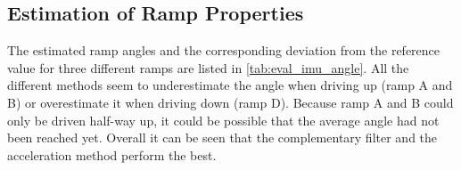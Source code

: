 \subsection{Estimation of Ramp Properties}
The estimated ramp angles and the corresponding deviation from the reference value for three different ramps are listed in \cref{tab:eval_imu_angle}.
All the different methods seem to underestimate the angle when driving up (ramp A and B) or overestimate it when driving down (ramp D).
Because ramp A and B could only be driven half-way up, it could be possible that the average angle had not been reached yet.
Overall it can be seen that the complementary filter and the acceleration method perform the best.

\begin{table}[htb]
    \centering
    \caption[ ramp angle estimation]{Estimation of the average ramp angle.}
    \label{tab:eval_imu_angle}
\end{table}
